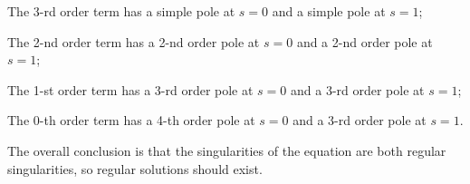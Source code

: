 The 3-rd order term has a simple pole at $s=0$ and a simple pole at $s=1$;

The 2-nd order term has a 2-nd order pole at $s=0$ and a 2-nd order pole at $s=1$;

The 1-st order term has a 3-rd order pole at $s=0$ and a 3-rd order pole at $s=1$;

The 0-th order term has a 4-th order pole at $s=0$ and a 3-rd order pole at $s=1$.

The overall conclusion is that the singularities of the equation are both regular singularities, so regular solutions should exist.

\clearpage

